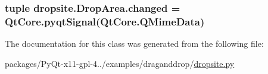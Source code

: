 \subsubsection[{changed}]{\setlength{\rightskip}{0pt plus 5cm}tuple dropsite.\+Drop\+Area.\+changed = Qt\+Core.\+pyqt\+Signal(Qt\+Core.\+Q\+Mime\+Data)\hspace{0.3cm}{\ttfamily [static]}}\label{classdropsite_1_1DropArea_a1c55c7c459f11c9a25e0c78d895a165e}


The documentation for this class was generated from the following file\+:\begin{DoxyCompactItemize}
\item 
packages/\+Py\+Qt-\/x11-\/gpl-\/4../examples/draganddrop/\hyperlink{dropsite_8py}{dropsite.\+py}\end{DoxyCompactItemize}

